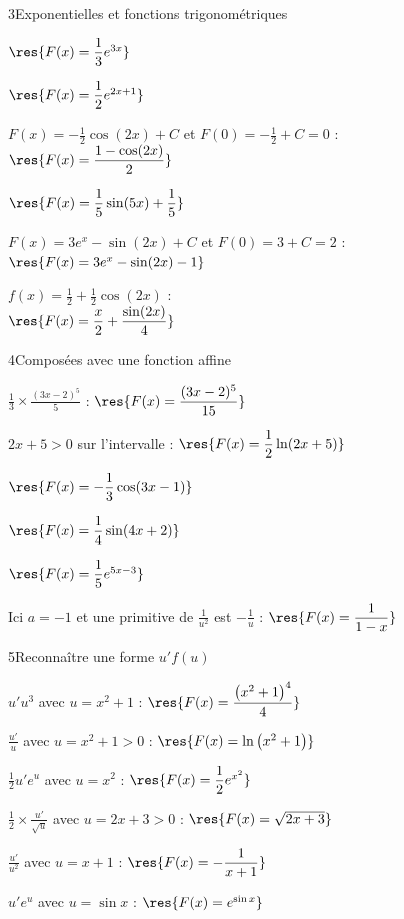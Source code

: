 \begin{deuxcolonnes}
\begin{corrige}{3}{Exponentielles et fonctions trigonométriques}
\begin{questions}
  \item $\res{F(x)=\dfrac13e^{3x}}$
  \item $\res{F(x)=\dfrac12e^{2x+1}}$
  \item $F(x)=-\frac12\cos(2x)+C$ et $F(0)=-\frac12+C=0$ :\\ $\res{F(x)=\dfrac{1-\cos(2x)}{2}}$
  \item $\res{F(x)=\dfrac15\sin(5x)+\dfrac15}$
  \item $F(x)=3e^{x}-\sin(2x)+C$ et $F(0)=3+C=2$ :\\ $\res{F(x)=3e^{x}-\sin(2x)-1}$
  \item $f(x)=\frac12+\frac12\cos(2x)$ :\\ $\res{F(x)=\dfrac x2+\dfrac{\sin(2x)}{4}}$
\end{questions}
\end{corrige}

\begin{corrige}{4}{Composées avec une fonction affine}
\begin{questions}
  \item $\frac13\times\frac{(3x-2)^{5}}{5}$ : $\res{F(x)=\dfrac{(3x-2)^{5}}{15}}$
  \item $2x+5>0$ sur l'intervalle : $\res{F(x)=\dfrac12\ln(2x+5)}$
  \item $\res{F(x)=-\dfrac13\cos(3x-1)}$
  \item $\res{F(x)=\dfrac14\sin(4x+2)}$
  \item $\res{F(x)=\dfrac15e^{5x-3}}$
  \item Ici $a=-1$ et une primitive de $\frac{1}{u^{2}}$ est $-\frac1u$ : $\res{F(x)=\dfrac{1}{1-x}}$
\end{questions}
\end{corrige}

\begin{corrige}{5}{Reconnaître une forme $u'f(u)$}
\begin{questions}
  \item $u'u^{3}$ avec $u=x^{2}+1$ : $\res{F(x)=\dfrac{\left(x^{2}+1\right)^{4}}{4}}$
  \item $\frac{u'}{u}$ avec $u=x^{2}+1>0$ : $\res{F(x)=\ln\left(x^{2}+1\right)}$
  \item $\frac12u'e^{u}$ avec $u=x^{2}$ : $\res{F(x)=\dfrac12e^{x^{2}}}$
  \item $\frac12\times\frac{u'}{\sqrt u}$ avec $u=2x+3>0$ : $\res{F(x)=\sqrt{2x+3}}$
  \item $\frac{u'}{u^{2}}$ avec $u=x+1$ : $\res{F(x)=-\dfrac{1}{x+1}}$
  \item $u'e^{u}$ avec $u=\sin x$ : $\res{F(x)=e^{\sin x}}$
\end{questions}
\end{corrige}


\end{deuxcolonnes}
